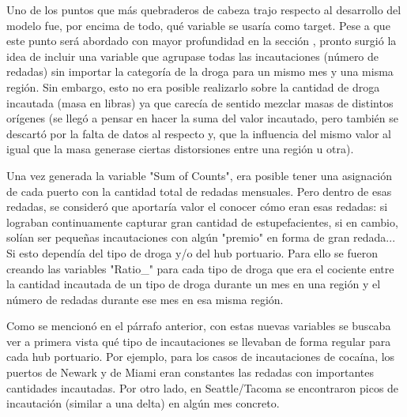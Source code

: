 \documentclass{article}
\begin{document}
		Uno de los puntos que más quebraderos de cabeza trajo respecto al desarrollo del modelo fue, por encima de todo, qué variable se usaría como target. Pese a que este punto será abordado con mayor profundidad en la sección \cite[Implementación Práctica del Modelo]{}, pronto surgió la idea de incluir una variable que agrupase todas las incautaciones (número de redadas) sin importar la categoría de la droga para un mismo mes y una misma región. Sin embargo, esto no era posible realizarlo sobre la cantidad de droga incautada (masa en libras) ya que carecía de sentido mezclar masas de distintos orígenes (se llegó a pensar en hacer la suma del valor incautado, pero también se descartó por la falta de datos al respecto y, que la influencia del mismo valor al igual que la masa generase ciertas distorsiones entre una región u otra).\ 
		
		Una vez generada la variable "Sum of Counts", era posible tener una asignación de cada puerto con la cantidad total de redadas mensuales. Pero dentro de esas redadas, se consideró que aportaría valor el conocer cómo eran esas redadas: si lograban continuamente capturar gran cantidad de estupefacientes, si en cambio, solían ser pequeñas incautaciones con algún "premio" en forma de gran redada... Si esto dependía del tipo de droga y/o del hub portuario. Para ello se fueron creando las variables "Ratio_" para cada tipo de droga que era el cociente entre la cantidad incautada de un tipo de droga durante un mes en una región y el número de redadas durante ese mes en esa misma región.\
		
		
		
		Como se mencionó en el párrafo anterior, con estas nuevas variables se buscaba ver a primera vista qué tipo de incautaciones se llevaban de forma regular para cada hub portuario. Por ejemplo, para los casos de incautaciones de cocaína, los puertos de Newark y de Miami eran constantes las redadas con importantes cantidades incautadas. Por otro lado, en Seattle/Tacoma se encontraron picos de incautación (similar a una delta) en algún mes concreto.\
		
\end{document}
